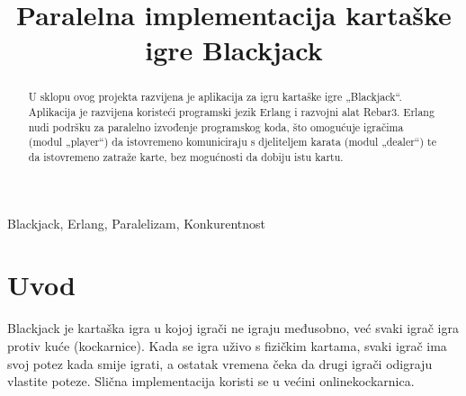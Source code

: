 \documentclass[conference]{IEEEtran}
\begin{document}
\pagestyle{plain} %

\title{Paralelna implementacija kartaške igre Blackjack}

\author{
    \and
    \and
    \and
    \and
}


\maketitle

\begin{abstract}
U sklopu ovog projekta razvijena je aplikacija za igru kartaške igre „Blackjack“. Aplikacija je razvijena koristeći programski jezik Erlang i razvojni alat Rebar3. Erlang nudi podršku za paralelno izvođenje programskog koda, što omogućuje igračima (modul „player“) da istovremeno komuniciraju s djeliteljem karata (modul „dealer“) te da istovremeno zatraže karte, bez mogućnosti da dobiju istu kartu.
\end{abstract}

\begin{IEEEkeywords}
Blackjack, Erlang, Paralelizam, Konkurentnost
\end{IEEEkeywords}

\section{Uvod}
Blackjack \cite{rules} je kartaška igra u kojoj igrači ne igraju međusobno, već svaki igrač igra protiv kuće (kockarnice). Kada se igra uživo s fizičkim kartama, svaki igrač ima svoj potez kada smije igrati, a ostatak vremena čeka da drugi igrači odigraju vlastite poteze. Slična implementacija koristi se u većini online\break kockarnica.
\end{document}
